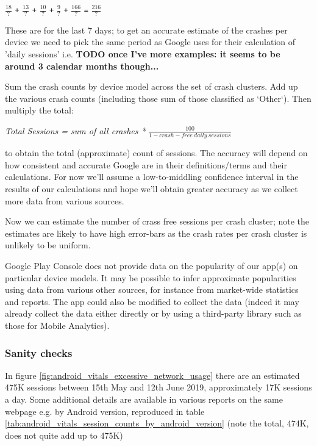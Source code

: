\(\frac{18}{?} \) \texttt{+} \(\frac{13}{?} \) \texttt{+} \(\frac{10}{?} \) \texttt{+} \(\frac{9}{?} \) \texttt{+} \(\frac{166}{?} \)  \texttt{=}  \(\frac{216}{?}\)

These are for the last 7 days; to get an accurate estimate of the crashes per device we need to pick the same period as Google uses for their calculation of 'daily sessions' i.e. \textbf{TODO once I've more examples: it seems to be around 3 calendar months though...}

Sum the crash counts by device model across the set of crash clusters. Add up the various crash counts (including those sum of those classified as `Other`). Then multiply the total: 

\textit{Total Sessions = sum of all crashes * } \(\frac{\textit{100}}{1 - crash-free\ daily\ sessions} \) 

to obtain the total (approximate) count of sessions. The accuracy will depend on how consistent and accurate Google are in their definitions/terms and their calculations. For now we'll assume a low-to-middling confidence interval in the results of our calculations and hope we'll obtain greater accuracy as we collect more data from various sources.

Now we can estimate the number of crass free sessions per crash cluster; note the estimates are likely to have high error-bars as the crash rates per crash cluster is unlikely to be uniform.

Google Play Console does not provide data on the popularity of our app(s) on particular device models. It may be possible to infer approximate popularities using data from various other sources, for instance from market-wide statistics and reports. The app could also be modified to collect the data (indeed it may already collect the data either directly or by using a third-party library such as those for Mobile Analytics).

\subsubsection{Sanity checks}
In figure \ref{fig:android_vitals_excessive_network_usage} there are an estimated 475K sessions between 15th May and 12th June 2019, approximately 17K sessions a day. Some additional details are available in various reports on the same webpage e.g. by Android version, reproduced in table \ref{tab:android_vitals_session_counts_by_android_version} (note the total, 474K, does not quite add up to 475K)

